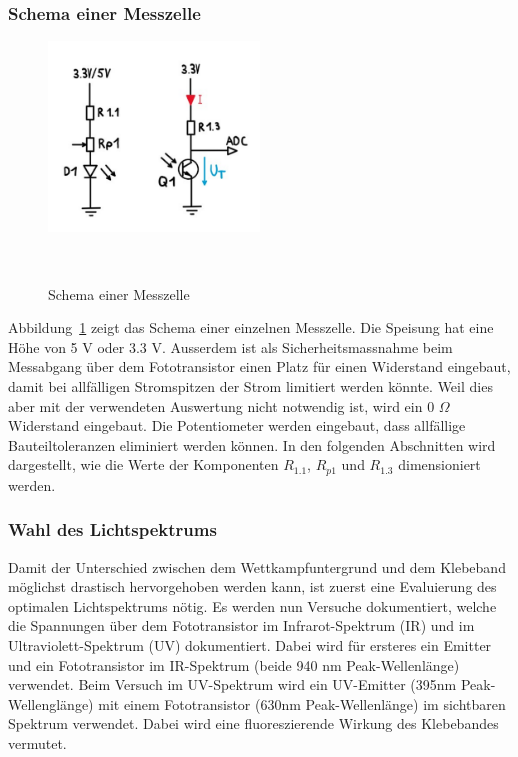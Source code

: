 \documentclass[main.tex]{subfiles} %
\begin{document}

\subsubsection*{Schema einer Messzelle}

\begin{figure}[H]
    \centering
    \includegraphics[width=0.5\textwidth]{./fig_Liniensensor/Schema_Messzelle_Liniensensor.pdf}
    \caption{Schema einer Messzelle}~\label{fig:Messzelle}
\end{figure}

Abbildung~\ref{fig:Messzelle} zeigt das Schema einer einzelnen Messzelle. Die Speisung hat eine Höhe von 5 V oder 3.3 V. 
Ausserdem ist als Sicherheitsmassnahme beim Messabgang über dem 
Fototransistor einen Platz für einen Widerstand eingebaut, damit bei allfälligen Stromspitzen der Strom 
limitiert werden könnte. Weil dies aber mit der verwendeten Auswertung nicht notwendig ist, wird ein
0 $\Omega$ Widerstand eingebaut. Die Potentiometer werden eingebaut, dass allfällige Bauteiltoleranzen
eliminiert werden können. In den folgenden Abschnitten wird dargestellt, wie die Werte der Komponenten $R_{1.1}$, $R_{p1}$ und $R_{1.3}$ 
dimensioniert werden.


\subsubsection*{Wahl des Lichtspektrums}
Damit der Unterschied zwischen dem Wettkampfuntergrund und dem Klebeband möglichst 
drastisch hervorgehoben werden kann, ist zuerst eine Evaluierung des optimalen
Lichtspektrums nötig. Es werden nun Versuche dokumentiert, welche die Spannungen 
über dem Fototransistor im Infrarot-Spektrum (IR) und im Ultraviolett-Spektrum (UV) 
dokumentiert. Dabei wird für ersteres ein Emitter und ein Fototransistor im IR-Spektrum (beide 940 nm Peak-Wellenlänge)
verwendet. Beim Versuch im UV-Spektrum wird ein UV-Emitter (395nm Peak-Wellenglänge) mit einem Fototransistor (630nm Peak-Wellenlänge) 
im sichtbaren Spektrum verwendet. Dabei wird eine fluoreszierende Wirkung des Klebebandes 
vermutet.
\end{document}
